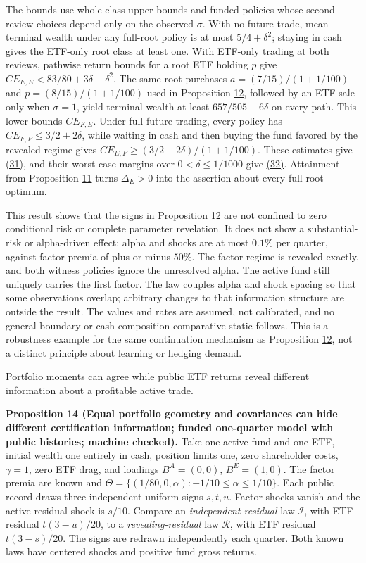 \documentclass[11pt]{article}
\begin{document}
The bounds use whole-class upper bounds and funded policies
whose second-review choices depend only on the observed
\(\sigma\). With no future trade, mean terminal wealth under
any full-root policy is at most \(5/4+\delta^2\); staying in
cash gives the ETF-only root class at least one. With ETF-only
trading at both reviews, pathwise return bounds for a root ETF
holding \(p\) give
\(CE_{E,E}<83/80+3\delta+\delta^2\).
The same root purchases \(a=(7/15)/(1+1/100)\) and
\(p=(8/15)/(1+1/100)\) used in Proposition \hyperref[res:Proposition-12]{12}, followed by
an ETF sale only when \(\sigma=1\), yield terminal wealth at
least \(657/505-6\delta\) on every path. This lower-bounds
\(CE_{F,E}\). Under full future trading, every policy has
\(CE_{F,F}\leq3/2+2\delta\), while waiting in cash and then
buying the fund favored by the revealed regime gives
\(CE_{E,F}\geq(3/2-2\delta)/(1+1/100)\). These estimates
give \hyperref[eq:31]{(31)}, and their worst-case margins over
\(0<\delta\leq1/1000\) give \hyperref[eq:32]{(32)}. Attainment from
Proposition \hyperref[res:Proposition-11]{11} turns \(\Delta_E>0\) into the assertion about
every full-root optimum.

This result shows that the signs in Proposition \hyperref[res:Proposition-12]{12} are not
confined to zero conditional risk or complete parameter
revelation. It does not show a substantial-risk or alpha-driven
effect: alpha and shocks are at most \(0.1\%\) per quarter,
against factor premia of plus or minus \(50\%\). The factor
regime is revealed exactly, and both witness policies ignore
the unresolved alpha. The active fund still uniquely carries
the first factor. The law couples alpha and shock spacing so
that some observations overlap; arbitrary changes to that
information structure are outside the result. The values and
rates are assumed, not calibrated, and no general boundary or
cash-composition comparative static follows. This is a robustness
example for the same continuation mechanism as Proposition \hyperref[res:Proposition-12]{12},
not a distinct principle about learning or hedging demand.

Portfolio moments can agree while public ETF returns reveal
different information about a profitable active trade.

\label{res:Proposition-14}
\textbf{Proposition 14 (Equal portfolio geometry and covariances can hide different certification information; funded one-quarter model with public histories; machine checked).}
Take one active fund and one ETF, initial wealth one entirely
in cash, position limits one, zero shareholder costs,
\(\gamma=1\), zero ETF drag, and loadings
\(B^A=(0,0)\), \(B^E=(1,0)\). The factor premia are known and
\(\Theta=\{(1/80,0,\alpha):-1/10\leq\alpha\leq1/10\}\).
Each public record draws three independent uniform signs
\(s,t,u\). Factor shocks vanish and the active residual shock
is \(s/10\). Compare an \emph{independent-residual} law
\(\mathcal I\), with ETF residual \(t(3-u)/20\), to a
\emph{revealing-residual} law \(\mathcal R\), with ETF residual
\(t(3-s)/20\). The signs are redrawn independently each
quarter. Both known laws have centered shocks and positive
fund gross returns.
\end{document}
